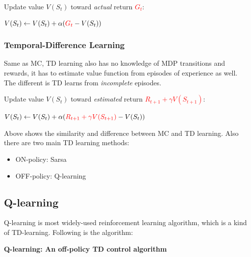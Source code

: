 \documentclass[a4paper, 11pt]{article} %
\begin{document}
Update value $V(S_{t})$ toward \textit{actual} return \textcolor{red}{$G_{t}$}:

\quad \quad $V(S_{t}) \leftarrow V(S_{t}) + \alpha (\textcolor{red}{G_{t}} - V(S_{t}))$ 

\subsubsection{Temporal-Difference Learning}
Same as MC, TD learning also has no knowledge of MDP transitions and rewards, it has to estimate value function from episodes of experience as well. The different is TD learns from \textit{incomplete} episodes. 
\vspace{3mm}

Update value $V(S_{t})$ toward \textit{estimated} return \textcolor{red}{$R_{t+1}+\gamma V(S_{t+1})$}:

\quad \quad $V(S_{t}) \leftarrow V(S_{t}) + \alpha (\textcolor{red}{R_{t+1}+\gamma V(S_{t+1})} - V(S_{t}))$ 

\vspace{3mm}
Above shows the similarity and difference between MC and TD learning. Also there are two main TD learning methods: 
\begin{itemize}
\item ON-policy: Sarsa
\item OFF-policy: Q-learning
\end{itemize}



\subsection{Q-learning}
Q-learning is most widely-used reinforcement learning algorithm, which is a kind of TD-learning.
Following is the algorithm:
\begin{center}\textbf{Q-learning: An off-policy TD control algorithm}

\vspace{1.5mm}


\end{center}
\end{document}
